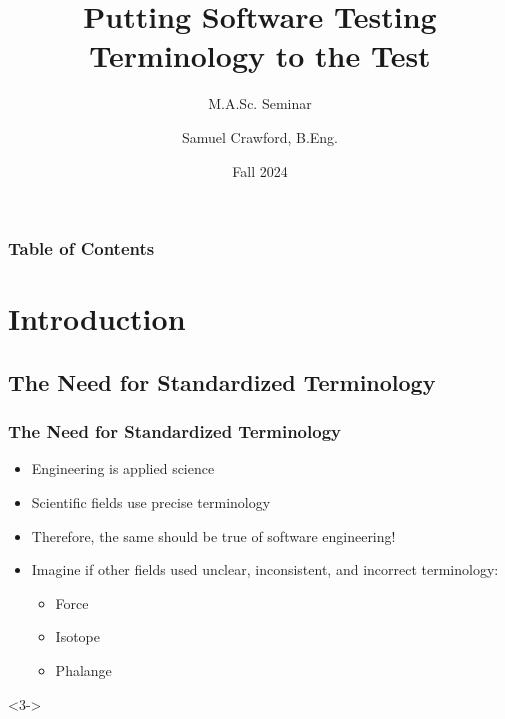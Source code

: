 \documentclass{beamer}
\title[Testing Terminology]{Putting Software Testing Terminology to the Test}
\subtitle{M.A.Sc. Seminar}
\author[Samuel Crawford]{Samuel Crawford, B.Eng.}
\institute[McMaster University]{McMaster University\\Department of Computing and Software}
\date{Fall 2024}
\begin{document}

\frame{\titlepage}


\begin{frame}
    \frametitle{Table of Contents}
    \tableofcontents
\end{frame}

\section{Introduction}

\subsection{The Need for Standardized Terminology}

\begin{frame}
    \frametitle{The Need for Standardized Terminology}
    \begin{itemize}
        \item Engineering is applied science
        \item Scientific fields use precise terminology
        \item Therefore, the same should be true of software engineering!
        \item <2-> Imagine if other fields used unclear, inconsistent, and
              incorrect terminology:
              \begin{itemize}
                  \item Force
                  \item Isotope
                  \item Phalange
              \end{itemize}
    \end{itemize}
    \begin{block}<3->{}{\litStd{}}
    \end{block}
\end{frame}
\end{document}
